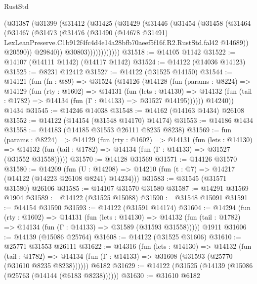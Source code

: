 \begin{lexlean}{RustStd}
\begin{coremodule}
              (@31387
                (@31399
                  (@31412
                    (@31425
                      (@31429
                        (@31446
                          (@31454
                            (@31458
                              (@31464
                                (@31467
                                  (@31473
                                    (@31476
                                      (@31490
                                        (@14678 @31491)
                                        LexLeanPreserve.C1b912f4fc4d4e14a28bfb70aeef5f16f.R2.RustStd.fal42
                                        @14689))
                                    @20590))
                                @29840))
                            @30803))))))))))))
@31518 := @14105 @1142
@31522 := @14107 (@14111 @1142) (@14117 @1142)
@31524 := @14122 (@14036 @14123)
@31525 := @8231 @12412
@31527 := @14122 (@31525 @14150)
@31544 := @14121
    (fun (fn : @89) =>
    @31524
      (@14126
        (@14128
          (fun (params : @8224) =>
          @14129
            (fun (rty : @1602) =>
            @14131
              (fun (lets : @14130) =>
              @14132 (fun (tail : @1782) => @14134 (fun (Γ : @14133) => @31527 @14195))))))
        @14240))
    @1434
@31545 := @14246 @14038
@31548 := @14162 (@14163 @1434) @26108
@31552 := @14122 (@14154 (@31548 @14170) @14174)
@31553 := @14186 @1434
@31558 := @14183 (@14185 @31553 @26111 @8235 @8238)
@31569 := fun (params : @8224) =>
  @14129
    (fun (rty : @1602) =>
    @14131
      (fun (lets : @14130) =>
      @14132 (fun (tail : @1782) => @14134 (fun (Γ : @14133) => @31527 (@31552 @31558)))))
@31570 := @14128 @31569
@31571 := @14126 @31570
@31580 := @14209
    (fun (U : @14208) => @14210 (fun (t : @7) => @14217 (@14122 (@14223 @26108 @8241) @14234)))
@31583 := @31545 (@31571 @31580) @26106
@31585 := @14107 @31570 @31580
@31587 := @14291 @31569 @1904
@31589 := @14122 (@31525 @15088)
@31590 := @31548 @15091
@31591 := @14154 @31590
@31593 := @14122 (@31591 @14174)
@31604 := @14294
    (fun (rty : @1602) =>
    @14131
      (fun (lets : @14130) =>
      @14132 (fun (tail : @1782) => @14134 (fun (Γ : @14133) => @31589 (@31593 @31558)))))
    @1911
@31606 := @14139 (@15086 @25764)
@31608 := @14122 (@31525 @31606)
@31610 := @25771 @31553 @26111
@31622 := @14316
    (fun (lets : @14130) =>
    @14132
      (fun (tail : @1782) =>
      @14134 (fun (Γ : @14133) => @31608 (@31593 (@25770 (@31610 @8235 @8238))))))
    @6182
@31629 := @14122 (@31525 (@14139 (@15086 (@25763 (@14144 (@6183 @8238))))))
@31630 := @31610 @6182

\end{coremodule}
\end{lexlean}
